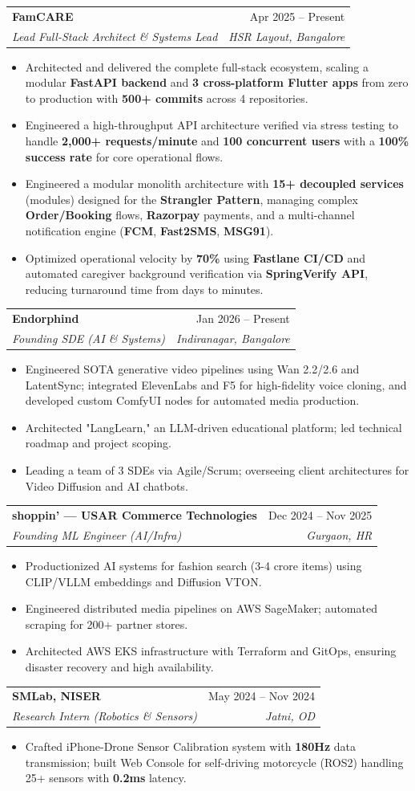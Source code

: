 \documentclass[letterpaper,10pt]{article} %
\makeatletter
\newcommand{\resumeItem}[1]{
  \item\small{
    {#1 \vspace{-2pt}}
  }
}
\newcommand{\resumeSubheading}[4]{
  \vspace{-1pt}\item
    \begin{tabular*}{0.97\textwidth}[t]{l@{\extracolsep{\fill}}r}
      \textbf{#1} & #2 \\
      \textit{\small#3} & \textit{\small #4} \\
    \end{tabular*}\vspace{-7pt}
}
\newcommand{\resumeItemListStart}{\begin{itemize}[leftmargin=*, nosep]}
\newcommand{\resumeItemListEnd}{\end{itemize}\vspace{-5pt}}
\makeatother
\begin{document}
    \resumeSubheading
      {FamCARE}{Apr 2025 -- Present}
      {Lead Full-Stack Architect \& Systems Lead}{HSR Layout, Bangalore}
      \resumeItemListStart
        \resumeItem{Architected and delivered the complete full-stack ecosystem, scaling a modular \textbf{FastAPI backend} and \textbf{3 cross-platform Flutter apps} from zero to production with \textbf{500+ commits} across 4 repositories.}
        \resumeItem{Engineered a high-throughput API architecture verified via stress testing to handle \textbf{2,000+ requests/minute} and \textbf{100 concurrent users} with a \textbf{100\% success rate} for core operational flows.}
        \resumeItem{Engineered a modular monolith architecture with \textbf{15+ decoupled services} (modules) designed for the \textbf{Strangler Pattern}, managing complex \textbf{Order/Booking} flows, \textbf{Razorpay} payments, and a multi-channel notification engine (\textbf{FCM}, \textbf{Fast2SMS}, \textbf{MSG91}).}
        \resumeItem{Optimized operational velocity by \textbf{70\%} using \textbf{Fastlane CI/CD} and automated caregiver background verification via \textbf{SpringVerify API}, reducing turnaround time from days to minutes.}
      \resumeItemListEnd

    \resumeSubheading
      {Endorphind}{Jan 2026 -- Present}
      {Founding SDE (AI \& Systems)}{Indiranagar, Bangalore}
      \resumeItemListStart
        \resumeItem{Engineered SOTA generative video pipelines using Wan 2.2/2.6 and LatentSync; integrated ElevenLabs and F5 for high-fidelity voice cloning, and developed custom ComfyUI nodes for automated media production.}
        \resumeItem{Architected "LangLearn," an LLM-driven educational platform; led technical roadmap and project scoping.}
        \resumeItem{Leading a team of 3 SDEs via Agile/Scrum; overseeing client architectures for Video Diffusion and AI chatbots.}
      \resumeItemListEnd
      
    \resumeSubheading
      {shoppin' — USAR Commerce Technologies}{Dec 2024 -- Nov 2025}
      {Founding ML Engineer (AI/Infra)}{Gurgaon, HR}
      \resumeItemListStart
        \resumeItem{Productionized AI systems for fashion search (3-4 crore items) using CLIP/VLLM embeddings and Diffusion VTON.}
        \resumeItem{Engineered distributed media pipelines on AWS SageMaker; automated scraping for 200+ partner stores.}
        \resumeItem{Architected AWS EKS infrastructure with Terraform and GitOps, ensuring disaster recovery and high availability.}
      \resumeItemListEnd

    \resumeSubheading
      {SMLab, NISER}{May 2024 -- Nov 2024}
      {Research Intern (Robotics \& Sensors)}{Jatni, OD}
      \resumeItemListStart
        \resumeItem{Crafted iPhone-Drone Sensor Calibration system with \textbf{180Hz} data transmission; built Web Console for self-driving motorcycle (ROS2) handling 25+ sensors with \textbf{0.2ms} latency.}
      \resumeItemListEnd
\end{document}
